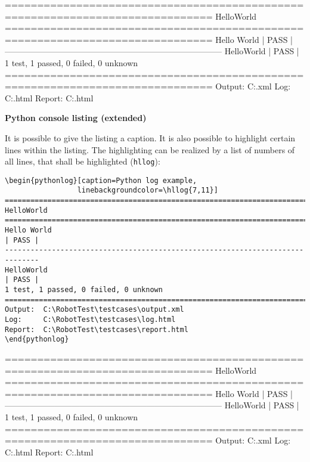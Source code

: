 \documentclass[a4paper,10pt]{report}
\begin{document}
\vspace{2ex}

\begin{pythonlog}
==============================================================================
HelloWorld
==============================================================================
Hello World                                                           | PASS |
------------------------------------------------------------------------------
HelloWorld                                                            | PASS |
1 test, 1 passed, 0 failed, 0 unknown
==============================================================================
Output:  C:\RobotTest\testcases\output.xml
Log:     C:\RobotTest\testcases\log.html
Report:  C:\RobotTest\testcases\report.html
\end{pythonlog}

\vspace{2ex}

\textbf{Python console listing (extended)}

It is possible to give the listing a caption. It is also possible to highlight certain lines within the listing. The highlighting can be realized by a list
of numbers of all lines, that shall be highlighted (\texttt{hllog}):

\vspace{2ex}

\begin{verbatim}
\begin{pythonlog}[caption=Python log example, 
                 linebackgroundcolor=\hllog{7,11}]
==============================================================================
HelloWorld
==============================================================================
Hello World                                                           | PASS |
------------------------------------------------------------------------------
HelloWorld                                                            | PASS |
1 test, 1 passed, 0 failed, 0 unknown
==============================================================================
Output:  C:\RobotTest\testcases\output.xml
Log:     C:\RobotTest\testcases\log.html
Report:  C:\RobotTest\testcases\report.html
\end{pythonlog}
\end{verbatim}

\newpage

\begin{pythonlog}[caption=Python log example, 
                 linebackgroundcolor=\hllog{7,11}]
==============================================================================
HelloWorld
==============================================================================
Hello World                                                           | PASS |
------------------------------------------------------------------------------
HelloWorld                                                            | PASS |
1 test, 1 passed, 0 failed, 0 unknown
==============================================================================
Output:  C:\RobotTest\testcases\output.xml
Log:     C:\RobotTest\testcases\log.html
Report:  C:\RobotTest\testcases\report.html
\end{pythonlog}
\end{document}
